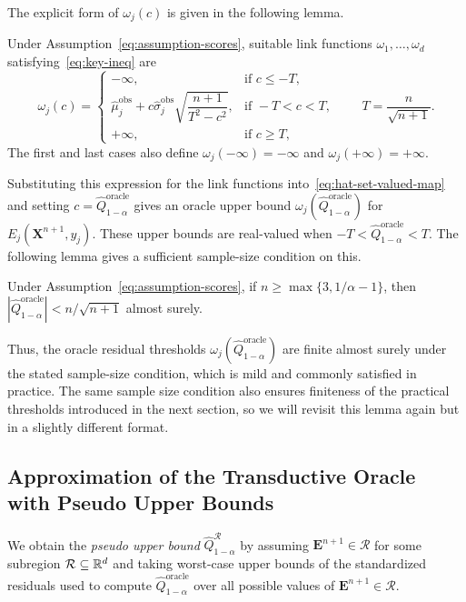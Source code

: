 The explicit form of $\omega_j(c)$ is given in the following lemma.

\begin{lemma}\label{lem:solution-key-ineq}
Under Assumption~\ref{eq:assumption-scores}, suitable link functions $\omega_1,\ldots,\omega_d$ satisfying~\eqref{eq:key-ineq} are
\[
\omega_j(c)
=\begin{cases}
-\infty,&\text{if }c\leq-T,\\[3pt]
\displaystyle
\hat\mu^{\mathrm{obs}}_j+c\hat\sigma^{\mathrm{obs}}_j
\sqrt{\dfrac{n+1}{T^2-c^2}},
&\text{if }-T<c<T,\\[6pt]
+\infty,&\text{if }c\geq T,
\end{cases}
\qquad T=\frac{n}{\sqrt{n+1}}.
\]
The first and last cases also define $\omega_j(-\infty)=-\infty$ and $\omega_j(+\infty)=+\infty$.
\end{lemma}

Substituting this expression for the link functions into~\eqref{eq:hat-set-valued-map} and setting $c=\hat Q^{\mathrm{oracle}}_{1-\alpha}$ gives an oracle upper bound $\omega_j(\hat Q^{\mathrm{oracle}}_{1-\alpha})$ for $E_j(\mathbf X^{n+1},y_j)$. These upper bounds are real-valued when $-T<\hat Q^{\mathrm{oracle}}_{1-\alpha}<T$. The following lemma gives a sufficient sample-size condition on this.

\begin{lemma}
Under Assumption~\ref{eq:assumption-scores}, if $n\geq\max\{3,1/\alpha-1\}$, then $|\hat Q^{\mathrm{oracle}}_{1-\alpha}|<n/\sqrt{n+1}$ almost surely.
\label{lem:finite-prediction-guarantee}
\end{lemma}

Thus, the oracle residual thresholds $\omega_j(\hat Q^{\mathrm{oracle}}_{1-\alpha})$ are finite almost surely under the stated sample-size condition, which is mild and commonly satisfied in practice. The same sample size condition also ensures finiteness of the practical thresholds introduced in the next section, so we will revisit this lemma again but in a slightly different format. 

\subsection{Approximation of the Transductive Oracle with Pseudo Upper Bounds}\label{sec:practical-approximation}

We obtain the \emph{pseudo upper bound} $\hat Q^{\mathcal R}_{1-\alpha}$ by assuming $\mathbf E^{n+1}\in\mathcal R$ for some subregion $\mathcal R\subseteq\mathbb{R}^d$ and taking worst-case upper bounds of the standardized residuals used to compute $\hat Q^{\mathrm{oracle}}_{1-\alpha}$ over all possible values of $\mathbf E^{n+1}\in\mathcal R$.

